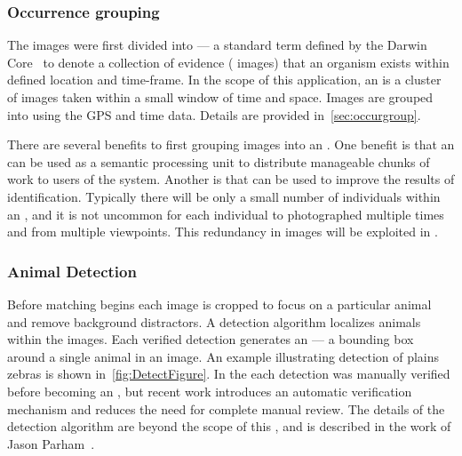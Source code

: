         \subsubsection{Occurrence grouping}
            The images were first divided into \glossterm{\occurrences{}} --- a standard term defined by the Darwin
            Core~\cite{wieczorek_darwin_2012} to denote a collection of evidence (\eg{} images) that an organism exists
            within defined location and time-frame. In the scope of this application, an \occurrence{} is a cluster of
            images taken within a small window of time and space. Images are grouped into \occurrences{} using the GPS
            and time data. Details are provided in~\cref{sec:occurgroup}.

            There are several benefits to first grouping images into an \occurrence{}. One benefit is that an
            \occurrence{} can be used as a semantic processing unit to distribute manageable chunks of work to users of
            the system. Another is that \occurrences{} can be used to improve the results of identification. Typically
            there will be only a small number of individuals within an \occurrence{}, and it is not uncommon for each
            individual to photographed multiple times and from multiple viewpoints. This redundancy in images will be
            exploited in .

        \subsubsection{Animal Detection}
            Before matching begins each image is cropped to focus on a particular animal and remove background
            distractors. A detection algorithm localizes animals within the images. Each verified detection generates an
            \glossterm{\annot{}} --- a bounding box around a single animal in an image. An example illustrating
            detection of plains zebras is shown in~\cref{fig:DetectFigure}. In the \GZC{} each detection was manually
            verified before becoming an \annot{}, but recent work introduces an automatic verification mechanism and
            reduces the need for complete manual review. The details of the detection algorithm are beyond the scope of
            this \thesis{}, and is described in the work of Jason Parham~\cite{parham_photographic_2015,parham_detecting_2016}.

            \DetectFigure{}

